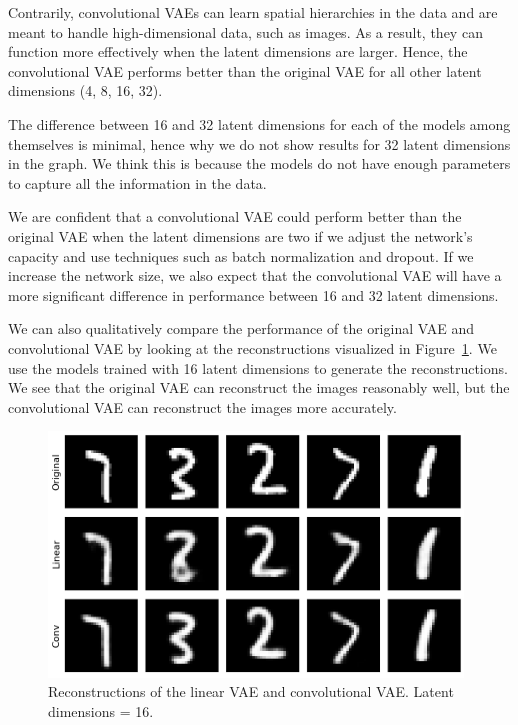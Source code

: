 Contrarily, convolutional VAEs can learn spatial hierarchies in the data and are meant to handle high-dimensional data, such as images. As a result, they can function more effectively when the latent dimensions are larger. Hence, the convolutional VAE performs better than the original VAE for all other latent dimensions (4, 8, 16, 32).

The difference between 16 and 32 latent dimensions for each of the models among themselves is minimal, hence why we do not show results for 32 latent dimensions in the graph. We think this is because the models do not have enough parameters to capture all the information in the data.

We are confident that a convolutional VAE could perform better than the original VAE when the latent dimensions are two if we adjust the network's capacity and use techniques such as batch normalization and dropout. If we increase the network size, we also expect that the convolutional VAE will have a more significant difference in performance between 16 and 32 latent dimensions.

We can also qualitatively compare the performance of the original VAE and convolutional VAE by looking at the reconstructions visualized in Figure~\ref{fig:reconstructions}. We use the models trained with 16 latent dimensions to generate the reconstructions. We see that the original VAE can reconstruct the images reasonably well, but the convolutional VAE can reconstruct the images more accurately.


\begin{figure}[h]
    \centering
    \includegraphics[width=11cm]{images/reconstructions.png}
    \setlength{\belowcaptionskip}{-10pt}
    \caption{Reconstructions of the linear VAE and convolutional VAE. Latent dimensions = 16.}
    \label{fig:reconstructions}
\end{figure}

